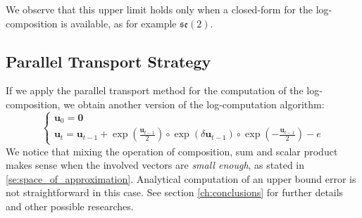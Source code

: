 We observe that this upper limit holds only when a closed-form for the log-composition is available, as for example $\mathfrak{se}(2)$.

\subsection{Parallel Transport Strategy}

If we apply the parallel transport method for the computation of the log-composition, we obtain another version of the log-computation algorithm:
\begin{equation}\label{eq:parallel_strategy}
\begin{cases}
\mathbf{u}_0 = \mathbf{0} \\
\mathbf{u}_{t} = \mathbf{u}_{t-1} + \exp(\frac{\mathbf{u}_{t-1}}{2}) \circ \exp(\delta \mathbf{u}_{t-1}) \circ \exp(-\frac{\mathbf{u}_{t-1}}{2}) - e
\end{cases}
\end{equation}
We notice that mixing the operation of composition, sum and scalar product makes sense when the involved vectors are \emph{small enough}, as stated in \ref{se:space_of_approximation}. 
Analytical computation of an upper bound error is not straightforward in this case. See section \ref{ch:conclusions} for further details and other possible researches.

